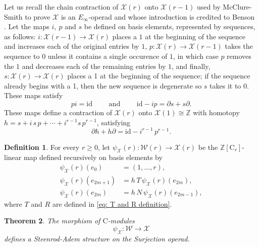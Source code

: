 \documentclass[A4]{amsart}
\newtheorem{theorem}{Theorem}
\theoremstyle{definition}
\newtheorem{definition}[theorem]{Definition}
\newcommand{\Z}{\mathbb{Z}}
\begin{document}
Let us recall the chain contraction of $\mathcal X(r)$ onto $\mathcal X(r-1)$ used by McClure-Smith to prove $\mathcal X$ is an $E_\infty$-operad and whose introduction is credited to Benson \cite{benson1998rep}. Let the maps $i,\ p$ and $s$ be defined on basis elements, represented by sequences, as follows: $i : \mathcal X(r-1) \to \mathcal X(r)$ places a $1$ at the beginning of the sequence and increases each of the original entries by $1$, $p : \mathcal X(r) \to \mathcal X(r-1)$ takes the sequence to $0$ unless it contains a single occurence of $1$, in which case $p$ removes the $1$ and decreases each of the remaining entries by $1$, and finally, $s : \mathcal X(r) \to \mathcal X(r)$ places a 1 at the beginning of the sequence; if the sequence already begins
with a 1, then the new sequence is degenerate so $s$ takes it to $0$. These maps satisfy
\begin{equation*}
p  i = \mathrm{id}
\qquad \text{ and } \qquad
\mathrm{id} - i  p = \partial s + s \partial.
\end{equation*}
These maps define a contraction of $\mathcal X(r)$ onto $\mathcal X(1) \cong \Z$ with homotopy $h = s + i\, s\, p + \cdots + i^{r-1} s\, p^{r-1}$, satisfying
\begin{equation*}
\partial h + h \partial = \mathrm{id} - i^{r-1}\,p^{r-1}.
\end{equation*}

\begin{definition} \label{def: Steenrod-Adem on surjection}
	For every $r \geq 0$, let $\psi_{\mathcal X}(r) : \mathcal W(r) \to \mathcal X(r)$ be the $\Z[\mathrm{C}_r]$-linear map defined recursively on basis elements by
	\begin{align*}
	\psi_{\mathcal X}(r)(e_0) & = (1, \dots, r), \\
	\psi_{\mathcal X}(r)(e_{2m+1}) & = h\,T\,\psi_{\mathcal X}(r)(e_{2m}), \\
	\psi_{\mathcal X}(r)(e_{2m}) & = h\,N\,\psi_{\mathcal X}(r)(e_{2m-1}),
	\end{align*}
	where $T$ and $R$ are defined in \eqref{eq: T and R definition}.
\end{definition}

\begin{theorem} \label{thm: Steenrod-Adem on surjection MS convention}
	The morphism of $\mathrm{C}$-modules
	\begin{equation*}
	\psi_{\mathcal X} \colon \mathcal W \to \mathcal X
	\end{equation*}
	defines a Steenrod-Adem structure on the Surjection operad.
\end{theorem}
\end{document}
